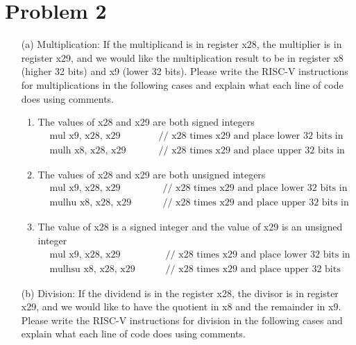 \documentclass[12pt]{article}
\begin{document}
    \section*{Problem 2}
    \begin{itemize}
        \item[(a)] Multiplication: If the multiplicand is in register x28, the multiplier is in register x29, and we would like the multiplication result to be in register x8 (higher 32 bits) and x9 (lower 32 bits). Please write the RISC-V instructions for multiplications in the following cases and explain what each line of code does using comments.
            \begin{enumerate}
                \item The values of x28 and x29 are both signed integers
                    \begin{align*}
                        &\text{mul x9, x28, x29}\qquad &&\text{// x28 times x29 and place lower 32 bits in x9} \\
                        &\text{mulh x8, x28, x29}\qquad &&\text{// x28 times x29 and place upper 32 bits in x8}
                    \end{align*}
                \item The values of x28 and x29 are both unsigned integers
                    \begin{align*}
                        &\text{mul x9, x28, x29}\qquad &&\text{// x28 times x29 and place lower 32 bits in x9} \\
                        &\text{mulhu x8, x28, x29}\qquad &&\text{// x28 times x29 and place upper 32 bits in x8}
                    \end{align*}
                \item The value of x28 is a signed integer and the value of x29 is an unsigned integer
                    \begin{align*}
                        &\text{mul x9, x28, x29}\qquad &&\text{// x28 times x29 and place lower 32 bits in x9} \\
                        &\text{mulhsu x8, x28, x29}\qquad &&\text{// x28 times x29 and place upper 32 bits in x8}
                    \end{align*}
            \end{enumerate}
        \item[(b)] Division: If the dividend is in the register x28, the divisor is in register x29, and we would like to have the quotient in x8 and the remainder in x9. Please write the RISC-V instructions for division in the following cases and explain what each line of code does using comments.

\end{itemize}
\end{document}
